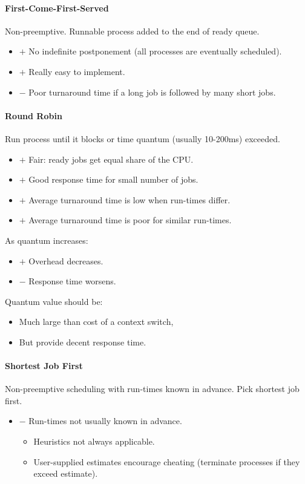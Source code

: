 \documentclass[twocolumn,english]{article}
\begin{document}
\paragraph{First-Come-First-Served}

Non-preemptive. Runnable process added to the end of ready queue. 
\begin{itemize}
\item $+$ No indefinite postponement (all processes are eventually scheduled). 
\item $+$ Really easy to implement. 
\item $-$ Poor turnaround time if a long job is followed by many short
jobs. 
\end{itemize}

\paragraph{Round Robin}

Run process until it blocks or time quantum (usually 10-200ms) exceeded. 
\begin{itemize}
\item $+$ Fair: ready jobs get equal share of the CPU. 
\item $+$ Good response time for small number of jobs. 
\item $+$ Average turnaround time is low when run-times differ. 
\item $+$ Average turnaround time is poor for similar run-times. 
\end{itemize}
As quantum increases: 
\begin{itemize}
\item $+$ Overhead decreases. 
\item $-$ Response time worsens. 
\end{itemize}
Quantum value should be: 
\begin{itemize}
\item Much large than cost of a context switch, 
\item But provide decent response time. 
\end{itemize}

\paragraph{Shortest Job First}

Non-preemptive scheduling with run-times known in advance. Pick shortest
job first. 
\begin{itemize}
\item $-$ Run-times not usually known in advance. 

\begin{itemize}
\item Heuristics not always applicable. 
\item User-supplied estimates encourage cheating (terminate processes if
they exceed estimate). 
\end{itemize}
\end{itemize}
\end{document}
